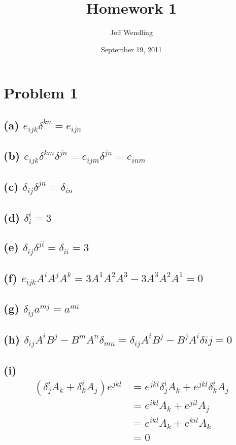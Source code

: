 \documentclass[12pt]{article}
\title{Homework 1}
\author{Jeff Wendling}
\date{September 19, 2011}
\newcommand{\eq}[1]{\begin{align*}#1\end{align*}}
\begin{document}
\maketitle
\section*{Problem 1}
\subsection*{(a) $e_{ijk}\delta^{kn} = e_{ijn}$}
\subsection*{(b) $e_{ijk}\delta^{km}\delta^{jn} = e_{ijm}\delta^{jn} = e_{inm}$}
\subsection*{(c) $\delta_{ij}\delta^{jn} = \delta_{in}$}
\subsection*{(d) $\delta_i^i = 3$}
\subsection*{(e) $\delta_{ij}\delta^{ji} = \delta_{ii} = 3$}
\subsection*{(f) $e_{ijk}A^iA^jA^k = 3A^1A^2A^3 - 3A^3A^2A^1 = 0$}
\subsection*{(g) $\delta_{ij}a^{mj} = a^{mi}$}
\subsection*{(h) $\delta_{ij}A^iB^j - B^mA^n\delta_{mn} = \delta_{ij}A^iB^j - B^jA^i\delta{ij} = 0$}
\subsection*{(i)
\eq{
	\left(\delta_j^iA_k + \delta_k^i A_j\right)e^{jkl} &= e^{jkl}\delta_j^iA_k + e^{jkl}\delta_k^iA_j\\
	&= e^{ikl}A_k + e^{jil}A_j\\
	&= e^{ikl}A_k + e^{kil}A_k\\
	&= 0
}}
\end{document}

